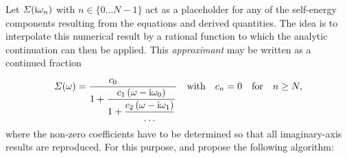 Let $\varSigma(\mathrm i \omega_n)$ with $n \in \{ 0 \dots N - 1 \}$ act as a placeholder
for any of the self-energy components resulting from the 
equations and derived quantities. The idea is to interpolate this numerical
result by a rational function to which the analytic continuation can then be
applied. This \emph{ approximant} may be written as a continued
fraction
%
\begin{equation} \label{continued fraction}
    \Sigma(\omega) = \dfrac{c_0 \, \phantom{(\omega - \I \omega_0)}}
    {1 + \dfrac{c_1 \, (\omega - \I \omega_0)}
    {1 + \dfrac{c_2 \, (\omega - \I \omega_1)} \dots}}
    \quad \text{with} \quad c_n = 0 \quad \text{for} \quad n \ge N,
\end{equation}
%
where the non-zero coefficients have to be determined so that all imaginary-axis
results are reproduced. For this purpose,  and 
propose the following algorithm:
%
